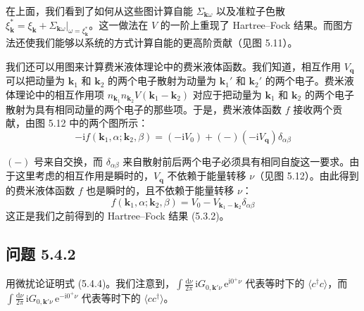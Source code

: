
在上面，我们看到了如何从这些图计算自能 $\Sigma_{\pmb{k}\omega}$ 以及准粒子色散 $\xi_{\pmb{k}}^{*}=\xi_{\pmb{k}}+\Sigma_{\pmb{k}\omega}\big|_{\omega=\xi_{\pmb{k}}^{*}}$。这一做法在 $V$ 的一阶上重现了 Hartree--Fock 结果。而图方法还使我们能够以系统的方式计算自能的更高阶贡献（见图 5.11）。

我们还可以用图来计算费米液体理论中的费米液体函数。我们知道，相互作用 $V_{\pmb{q}}$ 可以把动量为 $\pmb{k}_{1}$ 和 $\pmb{k}_{2}$ 的两个电子散射为动量为 $\pmb{k}_{1}'$ 和 $\pmb{k}_{2}'$ 的两个电子。费米液体理论中的相互作用项 $n_{\pmb{k}_{1}}n_{\pmb{k}_{2}}V(\pmb{k}_{1}-\pmb{k}_{2})$ 对应于把动量为 $\pmb{k}_{1}$ 和 $\pmb{k}_{2}$ 的两个电子散射为具有相同动量的两个电子的那些项。于是，费米液体函数 $f$ 接收两个贡献，由图 5.12 中的两个图所示：
\begin{equation*}
-\mathrm{i}f(\pmb{k}_{1},\alpha;\pmb{k}_{2},\beta)=(-\mathrm{i}V_{0})+(-)(-\mathrm{i}V_{\pmb{q}})\delta_{\alpha\beta}
\end{equation*}


$(-)$ 号来自交换，而 $\delta_{\alpha\beta}$ 来自散射前后两个电子必须具有相同自旋这一要求。由于这里考虑的相互作用是瞬时的，$V_{\pmb{q}}$ 不依赖于能量转移 $\nu$（见图 5.12）。由此得到的费米液体函数 $f$ 也是瞬时的，且不依赖于能量转移 $\nu$：
\begin{equation*}
f(\pmb{k}_{1},\alpha;\pmb{k}_{2},\beta)=V_{0}-V_{\pmb{k}_{1}-\pmb{k}_{2}}\delta_{\alpha\beta}
\end{equation*}
这正是我们之前得到的 Hartree--Fock 结果 (5.3.2)。

\subsection*{问题 5.4.2}

用微扰论证明式 (5.4.4)。我们注意到，$\int \frac{\mathrm{d}\nu}{2\pi}\,\allowbreak\mathrm{i}G_{0,\pmb{k}'\nu}\,\allowbreak\mathrm{e}^{\mathrm{i}0^{+}\nu}$ 代表等时下的 $\langle c^{\dagger}c\rangle$，而 $\int \frac{\mathrm{d}\nu}{2\pi}\,\allowbreak\mathrm{i}G_{0,\pmb{k}'\nu}\,\allowbreak\mathrm{e}^{-\mathrm{i}0^{+}\nu}$ 代表等时下的 $\langle cc^{\dagger}\rangle$。

